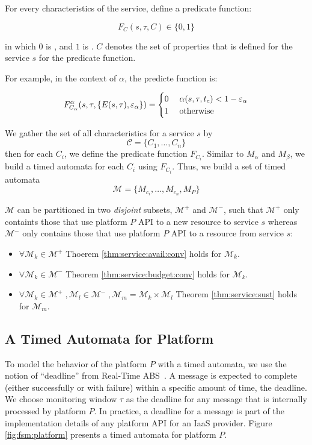 For every characteristics of the service, define a predicate function:

\[
F_C(s,\tau, C) \in \{0, 1\}
\]

in which $0$ is , and $1$ is .
$C$ denotes the set of properties that is defined for the service $s$ for the predicate function.

For example, in the context of $\alpha$, the predicte function is:

\[
F^\alpha_{C_\alpha}(s, \tau, \{E(s,\tau), \varepsilon_\alpha\}) = \begin{cases}
0  &\;  \alpha(s,\tau,t_c) < 1 - \varepsilon_\alpha \\
1 &\; \textnormal{otherwise}
\end{cases}
\]

We gather the set of all characteristics for a service $s$ by
\[
\mathcal{C} = \{C_1, \ldots, C_n\}
 \]
then for each $C_i$, we define the predicate function $F_{C_i}$.
Similar to $M_\alpha$ and $M_\beta$, we build a timed automata for each $C_i$ using $F_{C_i}$. 
Thus, we build a set of timed automata
\[
\mathcal{M} = \{M_{c_i}, \ldots, M_{c_n}, M_P\}
\] 

$\mathcal{M}$ can be partitioned in two \emph{disjoint} subsets, $\mathcal{M}^+$ and $\mathcal{M}^-$, such that $\mathcal{M}^+$ only containts those that use platform $P$ API to  a new resource to service $s$ whereas $\mathcal{M}^-$ only contains those that use platform $P$ API to  a resource from service $s$:
\begin{itemize}
  \item $\forall \mathcal{M}_k \in \mathcal{M}^+$ Thoerem \ref{thm:service:avail:conv} holds for $\mathcal{M}_k$.
  \item $\forall \mathcal{M}_k \in \mathcal{M}^-$ Theorem \ref{thm:service:budget:conv} holds for $\mathcal{M}_k$.
  \item $\forall \mathcal{M}_k \in \mathcal{M}^+ \; , \mathcal{M}_l \in \mathcal{M}^- \;, \mathcal{M}_m = \mathcal{M}_k \times \mathcal{M}_l$ Theorem \ref{thm:service:sust} holds for $\mathcal{M}_m$. 
\end{itemize}

\subsection{A Timed Automata for Platform} 
\label{sec:automata:platform}

To model the behavior of the platform $P$ with a timed automata, we use the notion of ``deadline'' from Real-Time ABS~\cite{JaghooriBCS09,bjork2013:rtabs}.
A message is expected to complete (either successfully or with failure) within a specific amount of time, the deadline.
We choose monitoring window $\tau$ as the deadline for any message that is internally processed by platform $P$.
In practice, a deadline for a message is part of the implementation details of any platform API for an IaaS provider.
Figure \ref{fig:fsm:platform} presents a timed automata for platform $P$.

